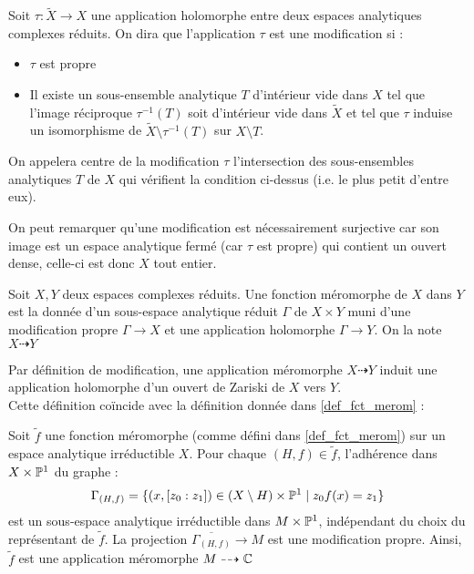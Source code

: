 \documentclass[a4page,10pt]{article}
\begin{document}
\begin{Def}
  Soit $\tau : \widetilde{X} \to X$ une application holomorphe entre deux espaces analytiques complexes r\'eduits. On dira que l'application $\tau$ est une modification si :
  \begin{itemize}
  \item $\tau$ est propre
    \item Il existe un sous-ensemble analytique $T$ d'int\'erieur vide dans $X$ tel que l'image r\'eciproque $\tau^{-1}(T)$ soit d'int\'erieur vide dans $\widetilde{X}$ et tel que $\tau$ induise un isomorphisme de $\widetilde{X}\setminus \tau^{-1}(T)$ sur $X \setminus T$.
    \end{itemize}
On appelera centre de la modification $\tau$ l'intersection des sous-ensembles analytiques $T$ de $X$ qui v\'erifient la condition ci-dessus (i.e. le plus petit d'entre eux).
\end{Def}

On peut remarquer qu'une modification est n\'ecessairement surjective car son image est un espace analytique ferm\'e (car $\tau$ est propre) qui contient un ouvert dense, celle-ci est donc $X$ tout entier.

\begin{Def}
Soit $X,Y$ deux espaces complexes r\'eduits. Une fonction m\'eromorphe de $X$ dans $Y$ est la donn\'ee d'un sous-espace analytique r\'eduit $\Gamma$ de $X \times Y$ muni d'une modification propre $\Gamma \to X$ et une application holomorphe $\Gamma \to Y$. On la note $X \dashrightarrow Y$
\end{Def}
Par d\'efinition de modification, une application m\'eromorphe $ X \dashrightarrow Y$ induit une application holomorphe d'un ouvert de Zariski de $X$ vers $Y$. \\
Cette d\'efinition co\"incide avec la d\'efinition donn\'ee dans \ref{def_fct_merom} : 
\begin{Lemme}
Soit $\widetilde{f}$ une fonction m\'eromorphe (comme d\'efini dans \ref{def_fct_merom}) sur un espace analytique irr\'eductible $X$. Pour chaque $(H,f) \in \widetilde{f}$, l'adh\'erence dans $X \times \P^1$ du graphe :
	\[\Gamma_{(H,f)}=\{(x,[z_0 : z_1]) \in (X \setminus H) \times \P^1 \mid z_0f(x)=z_1\}
	\]
	est un sous-espace analytique irr\'eductible dans $M \times \P^1$, ind\'ependant du choix du repr\'esentant de $\widetilde{f}$. La projection $\overline{\Gamma_{(H,f)}} \to M$ est une modification propre. Ainsi, $\widetilde{f}$ est une application m\'eromorphe $M \dashrightarrow \C$

\end{Lemme}
\end{document}
